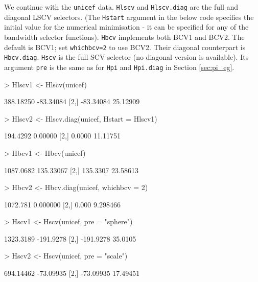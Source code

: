 \documentclass[a4paper,11pt]{article}
\begin{document}
We continue with the \texttt{unicef} data. 
\texttt{Hlscv} and \texttt{Hlscv.diag} are the full and diagonal
LSCV selectors. (The \texttt{Hstart} argument in the below code specifies the initial
value for the numerical minimisation - it can be specified
for any of the bandwidth selector functions). 
\texttt{Hbcv} implements both BCV1 and BCV2. The
default is BCV1; set \texttt{whichbcv=2} to use BCV2.
Their diagonal counterpart is \texttt{Hbcv.diag}. 
\texttt{Hscv} is the full SCV selector (no diagonal version is available).
Its argument \texttt{pre} is the same as for \texttt{Hpi} and \texttt{Hpi.diag}
in Section \ref{sec:pi_eg}.  
\begin{Schunk}
\begin{Sinput}
> Hlscv1 <- Hlscv(unicef)
\end{Sinput}
\begin{Soutput}
          [,1]      [,2]
[1,] 388.18250 -83.34084
[2,] -83.34084  25.12909
\end{Soutput}
\begin{Sinput}
> Hlscv2 <- Hlscv.diag(unicef, Hstart = Hlscv1)
\end{Sinput}
\begin{Soutput}
         [,1]     [,2]
[1,] 194.4292  0.00000
[2,]   0.0000 11.11751
\end{Soutput}
\begin{Sinput}
> Hbcv1 <- Hbcv(unicef)
\end{Sinput}
\begin{Soutput}
          [,1]      [,2]
[1,] 1087.0682 135.33067
[2,]  135.3307  23.58613
\end{Soutput}
\begin{Sinput}
> Hbcv2 <- Hbcv.diag(unicef, whichbcv = 2)
\end{Sinput}
\begin{Soutput}
         [,1]     [,2]
[1,] 1072.781 0.000000
[2,]    0.000 9.298466
\end{Soutput}
\begin{Sinput}
> Hscv1 <- Hscv(unicef, pre = "sphere")
\end{Sinput}
\begin{Soutput}
          [,1]      [,2]
[1,] 1323.3189 -191.9278
[2,] -191.9278   35.0105
\end{Soutput}
\begin{Sinput}
> Hscv2 <- Hscv(unicef, pre = "scale")
\end{Sinput}
\begin{Soutput}
          [,1]      [,2]
[1,] 694.14462 -73.09935
[2,] -73.09935  17.49451
\end{Soutput}
\end{Schunk}
\end{document}
